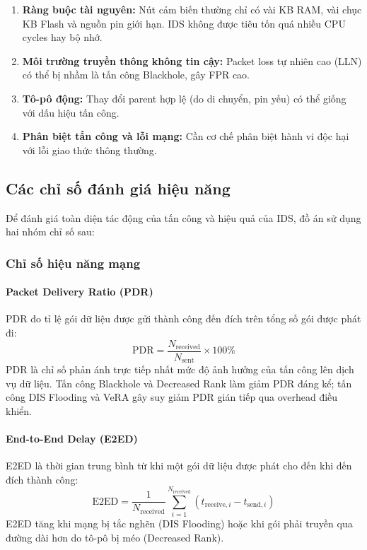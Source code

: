 \begin{enumerate}
    \item \textbf{Ràng buộc tài nguyên:} Nút cảm biến thường chỉ có
          vài KB RAM, vài chục KB Flash và nguồn pin giới hạn. IDS không
          được tiêu tốn quá nhiều CPU cycles hay bộ nhớ.
    \item \textbf{Môi trường truyền thông không tin cậy:} Packet loss
          tự nhiên cao (LLN) có thể bị nhầm là tấn công Blackhole, gây
          FPR cao.
    \item \textbf{Tô-pô động:} Thay đổi parent hợp lệ (do di chuyển,
          pin yếu) có thể giống với dấu hiệu tấn công.
    \item \textbf{Phân biệt tấn công và lỗi mạng:} Cần cơ chế phân
          biệt hành vi độc hại với lỗi giao thức thông thường.
\end{enumerate}

\subsection{Các chỉ số đánh giá hiệu năng}
\label{subsec:metrics}

Để đánh giá toàn diện tác động của tấn công và hiệu quả của IDS, đồ án
sử dụng hai nhóm chỉ số sau:

\subsubsection{Chỉ số hiệu năng mạng}

\paragraph{Packet Delivery Ratio (PDR)}
PDR đo tỉ lệ gói dữ liệu được gửi thành công đến đích trên tổng số gói
được phát đi:
\begin{equation}
    \text{PDR} = \frac{N_{\text{received}}}{N_{\text{sent}}} \times 100\%
    \label{eq:pdr}
\end{equation}
PDR là chỉ số phản ánh trực tiếp nhất mức độ ảnh hưởng của tấn công lên
dịch vụ dữ liệu. Tấn công Blackhole và Decreased Rank làm giảm PDR đáng
kể; tấn công DIS Flooding và VeRA gây suy giảm PDR gián tiếp qua
overhead điều khiển.

\paragraph{End-to-End Delay (E2ED)}
E2ED là thời gian trung bình từ khi một gói dữ liệu được phát cho đến
khi đến đích thành công:
\begin{equation}
    \text{E2ED} = \frac{1}{N_{\text{received}}}
    \sum_{i=1}^{N_{\text{received}}} (t_{\text{receive},i} -
    t_{\text{send},i})
    \label{eq:e2ed}
\end{equation}
E2ED tăng khi mạng bị tắc nghẽn (DIS Flooding) hoặc khi gói phải truyền
qua đường dài hơn do tô-pô bị méo (Decreased Rank).

